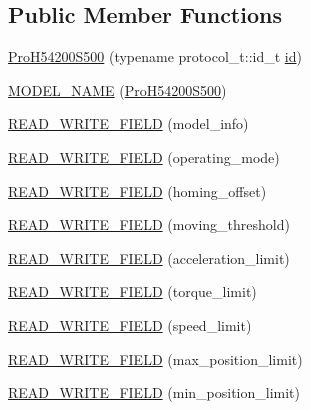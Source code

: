 \subsection*{Public Member Functions}
\begin{DoxyCompactItemize}
\item 
\hyperlink{classdynamixel_1_1servos_1_1_pro_h54200_s500_ac543de875d6b8b796b5ac5262f812b09}{Pro\+H54200\+S500} (typename protocol\+\_\+t\+::id\+\_\+t \hyperlink{classdynamixel_1_1servos_1_1_servo_a2d022081672e25a7bb57b76706e1cc57}{id})
\item 
\hyperlink{classdynamixel_1_1servos_1_1_pro_h54200_s500_ad276df94bdb9b19df85e59d4dda3cf92}{M\+O\+D\+E\+L\+\_\+\+N\+A\+M\+E} (\hyperlink{classdynamixel_1_1servos_1_1_pro_h54200_s500}{Pro\+H54200\+S500})
\item 
\hyperlink{classdynamixel_1_1servos_1_1_pro_h54200_s500_a76521c62777c96b58b76d6c52848fd19}{R\+E\+A\+D\+\_\+\+W\+R\+I\+T\+E\+\_\+\+F\+I\+E\+L\+D} (model\+\_\+info)
\item 
\hyperlink{classdynamixel_1_1servos_1_1_pro_h54200_s500_a18ee4956e74fe002314cb858cc093526}{R\+E\+A\+D\+\_\+\+W\+R\+I\+T\+E\+\_\+\+F\+I\+E\+L\+D} (operating\+\_\+mode)
\item 
\hyperlink{classdynamixel_1_1servos_1_1_pro_h54200_s500_ac34e20a41f8d85f4c5bfbd12f20d0a57}{R\+E\+A\+D\+\_\+\+W\+R\+I\+T\+E\+\_\+\+F\+I\+E\+L\+D} (homing\+\_\+offset)
\item 
\hyperlink{classdynamixel_1_1servos_1_1_pro_h54200_s500_aebfd320b1d34de855f421d2cdd78ebb6}{R\+E\+A\+D\+\_\+\+W\+R\+I\+T\+E\+\_\+\+F\+I\+E\+L\+D} (moving\+\_\+threshold)
\item 
\hyperlink{classdynamixel_1_1servos_1_1_pro_h54200_s500_abd9772c54c2f67273a91219455b7bdd4}{R\+E\+A\+D\+\_\+\+W\+R\+I\+T\+E\+\_\+\+F\+I\+E\+L\+D} (acceleration\+\_\+limit)
\item 
\hyperlink{classdynamixel_1_1servos_1_1_pro_h54200_s500_aa887fe7ecd9d57a4277d39f9481a49d2}{R\+E\+A\+D\+\_\+\+W\+R\+I\+T\+E\+\_\+\+F\+I\+E\+L\+D} (torque\+\_\+limit)
\item 
\hyperlink{classdynamixel_1_1servos_1_1_pro_h54200_s500_acc5581b020cf8aa18c1b7bab65e57247}{R\+E\+A\+D\+\_\+\+W\+R\+I\+T\+E\+\_\+\+F\+I\+E\+L\+D} (speed\+\_\+limit)
\item 
\hyperlink{classdynamixel_1_1servos_1_1_pro_h54200_s500_af4a60c5159794e50384f9a38c096fe40}{R\+E\+A\+D\+\_\+\+W\+R\+I\+T\+E\+\_\+\+F\+I\+E\+L\+D} (max\+\_\+position\+\_\+limit)
\item 
\hyperlink{classdynamixel_1_1servos_1_1_pro_h54200_s500_ad7a7a4b1a95ab7028bcb1883cbb095c8}{R\+E\+A\+D\+\_\+\+W\+R\+I\+T\+E\+\_\+\+F\+I\+E\+L\+D} (min\+\_\+position\+\_\+limit)

\end{DoxyCompactItemize}
